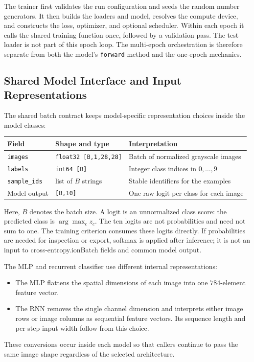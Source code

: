 \documentclass[11pt,a4paper]{article}
\begin{document}
The trainer first validates the run configuration and seeds the random number generators. It then builds the loaders and model, resolves the compute device, and constructs the loss, optimizer, and optional scheduler. Within each epoch it calls the shared training function once, followed by a validation pass. The test loader is not part of this epoch loop. The multi-epoch orchestration is therefore separate from both the model's \texttt{forward} method and the one-epoch mechanics.

\subsection{Shared Model Interface and Input Representations}

The shared batch contract keeps model-specific representation choices inside the model classes:

\begin{table}[ht]
\centering
\capt\begin{tabular}{p{1.35in}p{2.2in}p{3.15in}}
\toprule
Field & Shape and type & Interpretation \\
\midrule
\texttt{images} & \texttt{float32 [B,1,28,28]} & Batch of normalized grayscale images \\
\texttt{labels} & \texttt{int64 [B]} & Integer class indices in \(0,\ldots,9\) \\
\texttt{sample\_ids} & list of \(B\) strings & Stable identifiers for the examples \\
Model output & \texttt{[B,10]} & One raw logit per class for each image \\
\bottomrule
\end{tabular}
\end{table}

Here, \(B\) denotes the batch size. A logit is an unnormalized class score: the predicted class is \(\arg\max_{c} z_c\). The ten logits are not probabilities and need not sum to one. The training criterion consumes these logits directly. If probabilities are needed for inspection or export, softmax is applied after inference; it is not an input to cross-entropy.ion{Batch fields and common model output.}
\label{tab:batch-contract}


The MLP and recurrent classifier use different internal representations:
\begin{itemize}[leftmargin=*]
  \item The MLP flattens the spatial dimensions of each image into one \(784\)-element feature vector.
  \item The RNN removes the single channel dimension and interprets either image rows or image columns as sequential feature vectors. Its sequence length and per-step input width follow from this choice.
\end{itemize}
These conversions occur inside each model so that callers continue to pass the same image shape regardless of the selected architecture.
\end{document}
